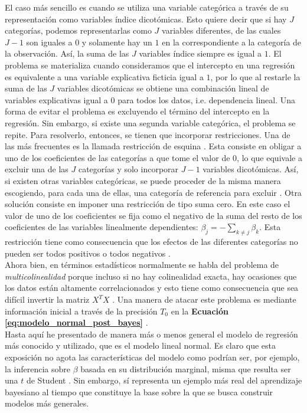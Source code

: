El caso más sencillo es cuando se utiliza una variable categórica a través de su representación como variables índice dicotómicas. Esto quiere decir que si hay $J$ categorías, podemos representarlas como $J$ variables diferentes, de las cuales $J-1$ son iguales a $0$ y solamente hay un $1$ en la correspondiente a la categoría de la observación. Así, la suma de las $J$ variables índice siempre es igual a $1$. El problema se materializa cuando consideramos que el intercepto en una regresión es equivalente a una variable explicativa ficticia igual a $1$, por lo que al restarle la suma de las $J$ variables dicotómicas se obtiene una combinación lineal de variables explicativas igual a $0$ para todos los datos, i.e. dependencia lineal. Una forma de evitar el problema es excluyendo el término del intercepto en la regresión. Sin embargo, si existe una segunda variable categórica, el problema se repite. Para resolverlo, entonces, se tienen que incorporar restricciones. Una de las más frecuentes es la llamada restricción de esquina \parencite[63]{Regueiro12}. Esta consiste en obligar a uno de los coeficientes de las categorías a que tome el valor de $0$, lo que equivale a excluir una de las $J$ categorías y solo incorporar $J-1$ variables dicotómicas. Así, si existen otras variables categóricas, se puede proceder de la misma manera escogiendo, para cada una de ellas, una categoría de referencia para excluir \parencite[68]{GelmanHill06}. Otra solución consiste en imponer una restricción de tipo suma cero. En este caso el valor de uno de los coeficientes se fija como el negativo de la suma del resto de los coeficientes de las variables linealmente dependientes: $\beta_j=-\sum\limits_{k\neq j}\beta_k$. Esta restricción tiene como consecuencia que los efectos de las diferentes categorías no pueden ser todos positivos o todos negativos \parencite[62]{Usi14}.\\

Ahora bien, en términos estadísticos normalmente se habla del problema de \textit{multicolinealidad} porque incluso si no hay colinealidad exacta, hay ocasiones que los datos están altamente correlacionados y esto tiene como consecuencia que sea difícil invertir la matriz $X^TX$ \parencite[58]{Usi14}. Una manera de atacar este problema es mediante información inicial a través de la precisión $T_0$ en la \textbf{Ecuación \ref{eq:modelo_normal_post_bayes}} \parencite[112]{Congdon06}.\\ 

Hasta aquí he presentado de manera más o menos general el modelo de regresión más conocido y utilizado, que es el modelo lineal normal. Es claro que esta exposición no agota las características del modelo como podrían ser, por ejemplo, la inferencia sobre $\beta$ basada en su distribución marginal, misma que resulta ser una $t$ de Student \parencite[16]{GP98}. Sin embargo, sí representa un ejemplo más real del aprendizaje bayesiano al tiempo que constituye la base sobre la que se busca construir modelos más generales. 



